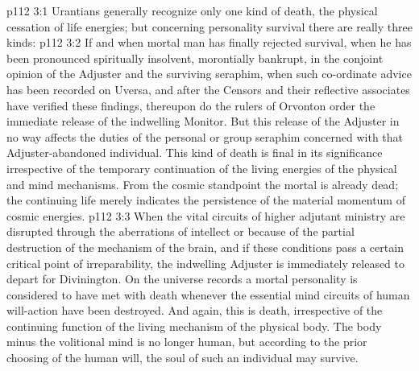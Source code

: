 \vs p112 3:1 Urantians generally recognize only one kind of death, the physical cessation of life energies; but concerning personality survival there are really three kinds:
\vs p112 3:2 \bibnobreakspace {} If and when mortal man has finally rejected survival, when he has been pronounced spiritually insolvent, morontially bankrupt, in the conjoint opinion of the Adjuster and the surviving seraphim, when such co\hyp{}ordinate advice has been recorded on Uversa, and after the Censors and their reflective associates have verified these findings, thereupon do the rulers of Orvonton order the immediate release of the indwelling Monitor. But this release of the Adjuster in no way affects the duties of the personal or group seraphim concerned with that Adjuster\hyp{}abandoned individual. This kind of death is final in its significance irrespective of the temporary continuation of the living energies of the physical and mind mechanisms. From the cosmic standpoint the mortal is already dead; the continuing life merely indicates the persistence of the material momentum of cosmic energies.
\vs p112 3:3 \bibnobreakspace {} When the vital circuits of higher adjutant ministry are disrupted through the aberrations of intellect or because of the partial destruction of the mechanism of the brain, and if these conditions pass a certain critical point of irreparability, the indwelling Adjuster is immediately released to depart for Divinington. On the universe records a mortal personality is considered to have met with death whenever the essential mind circuits of human will\hyp{}action have been destroyed. And again, this is death, irrespective of the continuing function of the living mechanism of the physical body. The body minus the volitional mind is no longer human, but according to the prior choosing of the human will, the soul of such an individual may survive.
